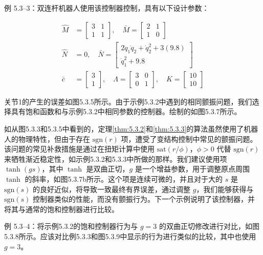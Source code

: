 \documentclass[UTF8,12pt,a4paper]{ctexart}
\begin{document}
\begin{example}[VSS控制器 2（饱和）]
例 5.3--3：双连杆机器人使用该控制器控制，具有以下设计参数：

\begin{equation*}
\begin{aligned}
\hat{M} &= \begin{bmatrix} 3 & 1 \\ 1 & 1 \end{bmatrix}, \quad \bar{M} = \begin{bmatrix} 2 & 1 \\ 1 & 0 \end{bmatrix} \\
\hat{N} &= 0, \quad \bar{N} = \begin{bmatrix} 2\dot{q}_1\dot{q}_2 + \dot{q}_2^2 + 3(9.8) \\ \dot{q}_1^2 + 9.8 \end{bmatrix} \\
\bar{c} &= \begin{bmatrix} 3 \\ 1 \end{bmatrix}, \quad \Lambda = \begin{bmatrix} 3 & 0 \\ 0 & 1 \end{bmatrix}, \quad K = \begin{bmatrix} 10 \\ 10 \end{bmatrix}
\end{aligned}
\end{equation*}

关节1的产生的误差如图5.3.5所示。由于示例5.3.2中遇到的相同颤振问题，我们选择具有饱和函数和与示例5.3.2中相同参数的控制器。绘制的如图5.3.7所示。
\end{example}

如从图5.3.3和5.3.5中看到的，定理\ref{thm:5.3.2}和\ref{thm:5.3.3}的算法虽然使用了机器人的物理特性，但由于存在 $\text{sgn}(r)$ 项，遭受了变结构控制中常见的颤振问题。该问题的常见补救措施是通过在扭矩计算中使用 $\text{sat}(r/\phi)$，$\phi > 0$ 代替 $\text{sgn}(r)$ 来牺牲渐近稳定性，如示例5.3.2和5.3.3中所做的那样。我们建议使用项 $\tanh(gs)$，其中 $\tanh$ 是双曲正切，$g$ 是一个增益参数，用于调整原点周围 $\tanh$ 的斜率，如图5.3.7b所示。这个项是连续可微的，并且对于大的 $s$ 是 $\text{sgn}(s)$ 的良好近似，将导致一致最终有界误差，通过调整 $g$，我们能够获得与 $\text{sgn}(s)$ 控制器类似的性能，而没有颤振行为。下一个示例说明了该控制器，并将其与通常的饱和控制器进行比较。

\begin{example}
例 5.3--4：将示例5.3.2的饱和控制器行为与 $g = 3$ 的双曲正切修改进行对比，如图5.3.8所示。应该对比例5.3.3和图5.3.9中显示的行为进行类似的比较，其中也使用 $g = 3$。
\end{example}
\end{document}
